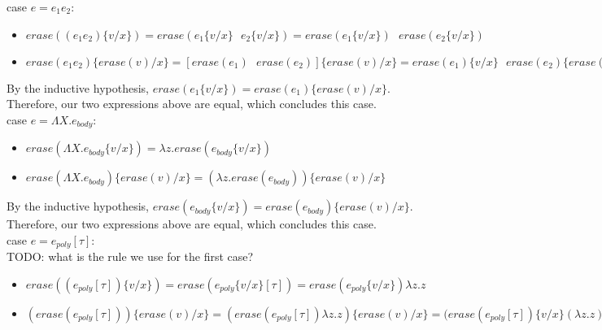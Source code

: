 \documentclass[10pt]{article}
\begin{document}
\begin{exercise}
{\sc case} $e = e_1e_2$:
\begin{itemize}
\item $\mathit{erase}((e_1e_2)\{v/x\}) = \mathit{erase}(e_1\{v/x\} \text{ } e_2\{v/x\}) =  \mathit{erase}(e_1\{v/x\})\text{ } \mathit{erase}(e_2\{v/x\})$
\item $\mathit{erase}(e_1e_2)\{\mathit{erase}(v)/x\} =  [\mathit{erase}(e_1)\text{ } \mathit{erase}(e_2)] \{\mathit{erase}(v)/x\} = \mathit{erase}(e_1)\{v/x\} \text{ } \mathit{erase}(e_2)\{\mathit{erase}(v)/x\}$\\
\end{itemize}

By the inductive hypothesis, $\mathit{erase}(e_1\{v/x\}) = \mathit{erase}(e_1)\{\mathit{erase}(v)/x\}$. Therefore, our two expressions above are equal, which concludes this case. \checkmark\\

{\sc case} $e = \Lambda X.e_{body}$: 
\begin{itemize}
\item $\mathit{erase}(\Lambda X.e_{body}\{v/x\}) = \lambda z. \mathit{erase}(e_{body}\{v/x\}) $
\item $\mathit{erase}(\Lambda X.e_{body})\{\mathit{erase}(v)/x\} = (\lambda z. \mathit{erase}(e_{body}))\{\mathit{erase}(v)/x\}$ 

\end{itemize}

By the inductive hypothesis, $\mathit{erase}(e_{body}\{v/x\}) = \mathit{erase}(e_{body})\{\mathit{erase}(v)/x\}$. Therefore, our two expressions above are equal, which concludes this case. \checkmark\\


{\sc case} $e = e_{poly}[\tau] $:\\

TODO: what is the rule we use for the first case?\\

\begin{itemize}
\item $\mathit{erase}((e_{poly}[\tau])\{v/x\}) = \mathit{erase}(e_{poly}\{v/x\}[\tau]) = \mathit{erase}(e_{poly} \{v/x\}) \lambda z.z$
\item $(\mathit{erase}(e_{poly}[\tau]))\{\mathit{erase}(v)/x\} = (\mathit{erase}(e_{poly}[\tau]) \lambda z.z)\{\mathit{erase}(v)/x\} = (\mathit{erase}(e_{poly}[\tau])\{v/x\} (\lambda z.z) \{\mathit{erase}(v)/x\}$\\
\end{itemize}


\end{exercise}
\end{document}
